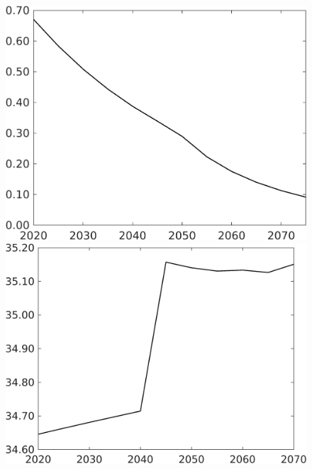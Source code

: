 \documentclass[12pt]{article}
\begin{document}
\begin{figure}[h!!]
\begin{minipage}[]{0.32\textwidth}
	\end{minipage}
	\begin{minipage}[]{0.32\textwidth}
		\includegraphics[width=1\textwidth]{../../codding_model/own_basedOnFried/optimalPol_010922_revision/figures/all_13Sept22/CompTaufPER_bytaul_Reg0_sn_spillover0_nsk1_xgr0_knspil0_sep0_LFlimit1_emsbase0_countec0_GovRev0_etaa0.79_lgd0.png}
	\end{minipage}		
	\begin{minipage}[]{0.32\textwidth}
		\includegraphics[width=1\textwidth]{../../codding_model/own_basedOnFried/optimalPol_010922_revision/figures/all_13Sept22/CompTaufPER_bytaul_Reg0_gAf_spillover0_nsk1_xgr0_knspil0_sep0_LFlimit1_emsbase0_countec0_GovRev0_etaa0.79_lgd0.png}

\end{minipage}
\end{figure}
\end{document}
